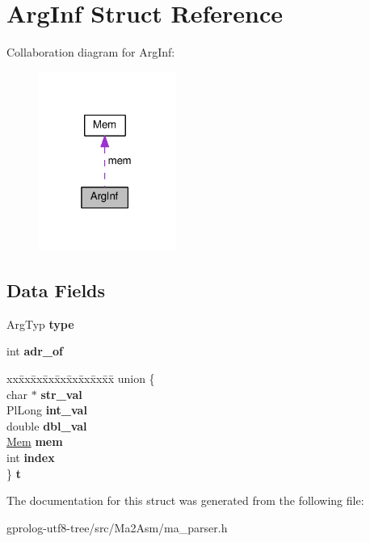 \hypertarget{structArgInf}{}\section{Arg\+Inf Struct Reference}
\label{structArgInf}


Collaboration diagram for Arg\+Inf\+:\nopagebreak
\begin{figure}[H]
\begin{center}
\leavevmode
\includegraphics[width=127pt]{structArgInf__coll__graph}
\end{center}
\end{figure}
\subsection*{Data Fields}
\begin{DoxyCompactItemize}
\item 
Arg\+Typ {\bfseries type}\hypertarget{structArgInf_ad416abaf87d2e52a23c4d2eb517919e4}{}\label{structArgInf_ad416abaf87d2e52a23c4d2eb517919e4}

\item 
int {\bfseries adr\+\_\+of}\hypertarget{structArgInf_a9a45faac36b5ff6b969faa85446f40e1}{}\label{structArgInf_a9a45faac36b5ff6b969faa85446f40e1}

\item 
\begin{tabbing}
xx\=xx\=xx\=xx\=xx\=xx\=xx\=xx\=xx\=\kill
union \{\\
\>char $\ast$ {\bfseries str\_val}\\
\>PlLong {\bfseries int\_val}\\
\>double {\bfseries dbl\_val}\\
\>\hyperlink{structMem}{Mem} {\bfseries mem}\\
\>int {\bfseries index}\\
\} {\bfseries t}\hypertarget{structArgInf_ae7f40cf76bee98b10f0eb3d865b2b912}{}\label{structArgInf_ae7f40cf76bee98b10f0eb3d865b2b912}
\\

\end{tabbing}\end{DoxyCompactItemize}


The documentation for this struct was generated from the following file\+:\begin{DoxyCompactItemize}
\item 
gprolog-\/utf8-\/tree/src/\+Ma2\+Asm/ma\+\_\+parser.\+h\end{DoxyCompactItemize}

